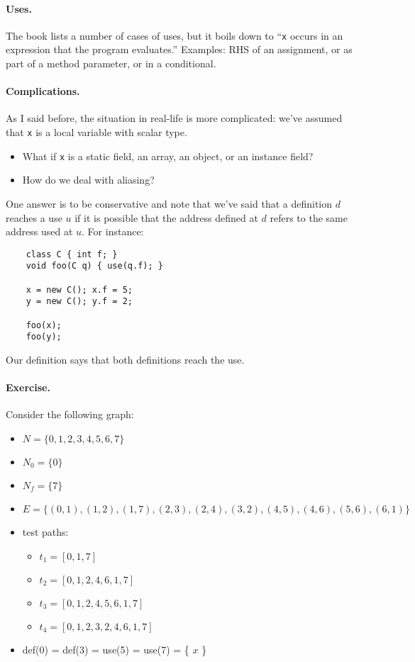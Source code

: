 \documentclass[11pt]{article}
\begin{document}
\paragraph{Uses.} The book lists a number of cases of uses, but
it boils down to ``{\tt x} occurs in an expression that the program
evaluates.'' Examples: RHS of an assignment, or as part of a method
parameter, or in a conditional.

\paragraph{Complications.} 
As I said before, the situation in real-life is more complicated:
we've assumed that {\tt x} is a local variable with scalar type.
\begin{itemize}
\item What if {\tt x} is a static field, an array, an object, or an
instance field?
\item How do we deal with aliasing? 
\end{itemize}

\newpage
One answer is to be conservative and note that we've said that a
definition $d$ reaches a use $u$ if it is possible that the address
defined at $d$ refers to the same address used at $u$. For 
instance:

{\scriptsize
\begin{lstlisting}
    class C { int f; }
    void foo(C q) { use(q.f); }

    x = new C(); x.f = 5;
    y = new C(); y.f = 2;

    foo(x);
    foo(y);
\end{lstlisting}
}
Our definition says that both definitions reach the use.

\paragraph{Exercise.} Consider the following graph:
\begin{itemize}
\item $N = \{0, 1, 2, 3, 4, 5, 6, 7\}$
\item $N_0 = \{ 0 \}$
\item $N_f = \{ 7 \}$
\item $E = \{ (0, 1), (1, 2), (1, 7), (2, 3), (2, 4), (3, 2), (4, 5), (4, 6), (5, 6), (6, 1) \}$
\item test paths: \begin{itemize}
\item $t_1 = [0,1,7]$
\item $t_2 = [0,1,2,4,6,1,7]$
\item $t_3 = [0,1,2,4,5,6,1,7]$
\item $t_4 = [0,1,2,3,2,4,6,1,7]$
\end{itemize}
  \item def(0) = def(3) = use(5) = use(7) = \{ $x$ \}
\end{itemize}
\end{document}

